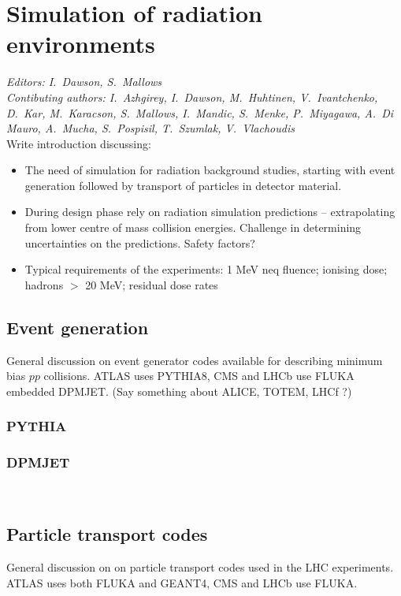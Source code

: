 \section{Simulation of radiation environments}
\label{sec:simulation}

{\it Editors: I.~Dawson, S.~Mallows}  \\
{\it Contibuting authors: I.~Azhgirey, I.~Dawson, M.~Huhtinen, V.~Ivantchenko, D.~Kar, M.~Karacson, S.~Mallows, I.~Mandic, S.~Menke, P.~Miyagawa, A.~Di\,Mauro, A.~Mucha, S.~Pospisil, T.~Szumlak, V.~Vlachoudis}  \\

\noindent
Write introduction discussing: 
\begin{itemize}
\item The need of simulation for radiation background studies, starting with event generation followed by transport of particles in detector material. 
\item During design phase rely on radiation simulation predictions -- extrapolating from lower centre of mass collision energies. Challenge in determining uncertainties on the predictions. Safety factors?
\item Typical requirements of the experiments: 1 MeV neq fluence; ionising dose; hadrons $>$ 20 MeV; residual dose rates
\end{itemize}

\subsection{Event generation}
General discussion on event generator codes available for describing minimum bias $pp$ collisions. ATLAS uses PYTHIA8, CMS and LHCb use FLUKA embedded DPMJET. (Say something about ALICE, TOTEM, LHCf ?)

\subsubsection{PYTHIA}
\subsubsection{DPMJET}

~

\subsection{Particle transport codes}
General discussion on on particle transport codes used in the LHC experiments. ATLAS uses both FLUKA and GEANT4, CMS and LHCb use FLUKA.

